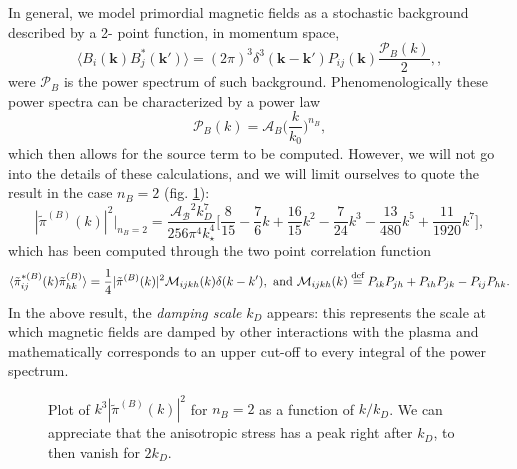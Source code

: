 In general, we model primordial magnetic fields as a stochastic background described by a 2- point function, in momentum space,
\begin{equation}
    \langle B_i(\mathbf{k})B^*_j(\mathbf{k'})\rangle=(2\pi)^3\delta^3(\mathbf{k}-\mathbf{k'})P_{ij}(\mathbf{k})\frac{\mathcal P_B(k)}{2},\label{eq:magnetic_2pt},
\end{equation}
were $\mathcal P_B$ is the power spectrum of such background. Phenomenologically these power spectra can be characterized by a power law
$$\mathcal{P}_B(k)=\mathcal A_B\bigg(\frac{k}{k_0}\bigg)^{n_B},$$
which then allows for the source term to be computed. However, we will not go into the details of these calculations, and we will limit ourselves to quote \cite{Paoletti_2009} the result in the case $n_B=2$ (fig. \ref{fig:stress_B}):
$$
|\tilde \pi^{(B)}(k)|^2\bigg|_{n_B=2}=\frac{\mathcal{A_B}^2k_D^7}{256\pi^4k_\star ^4}\bigg[\frac{8}{15}-\frac{7}{6}k+\frac{16}{15}k^2-\frac{7}{24}k^3-\frac{13}{480}k^5+\frac{11}{1920}k^7\bigg],
$$
which has been computed through the two point correlation function 
$$\langle\tilde\pi^{*(B)}_{ij}(k)\tilde\pi^{(B)}_{hk}\rangle=\frac{1}{4}|\tilde \pi^{(B)}(k)|^2\mathcal{M}_{ijkh}(k)\delta(k-k'),\text{ and }\mathcal{M}_{ijkh}(k)\stackrel{\text{def}}{=} P_{ik}P_{jh}+P_{ih}P_{jk}-P_{ij}P_{hk}.$$
In the above result, the \emph{damping scale} $k_D$ appears: this represents the scale at which magnetic fields are damped by other interactions with the plasma and mathematically corresponds to an upper cut-off to every integral of the power spectrum.

\begin{figure}[h!]
    \centering
    \label{fig:stress_B}
    \caption{Plot of $k^3 |\tilde{\pi}^{(B)}(k)|^2$ for $n_B=2$ as a function of $k/k_D$. We can appreciate that the anisotropic stress has a peak right after $k_D$, to then vanish for $2k_D$.}
\end{figure}


